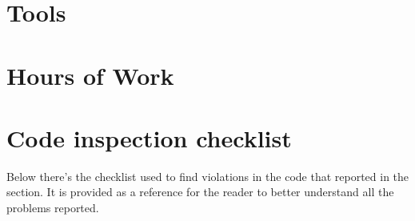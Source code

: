 \newpage
\begin{appendices}
\section{Tools}
\break
\section{Hours of Work}
\break
\section{Code inspection checklist}
Below there's the checklist used to find violations in the code that reported in the  section. It is provided as a reference for the reader to better understand all the problems reported.

\end{appendices}